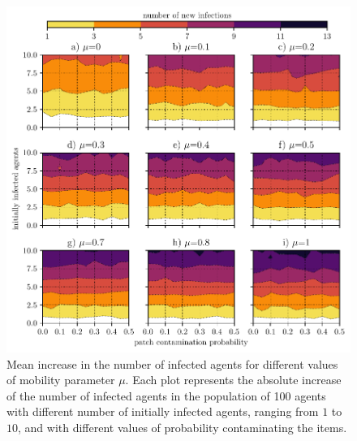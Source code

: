 \documentclass[10pt,a4paper]{article}
\begin{document}
\begin{figure}[ht!]
\begin{center}
\includegraphics[scale=0.75]{plots/sick_increase_large_s_pop100.pdf}
\end{center}
\caption{Mean increase in the number of infected agents for different values of mobility parameter $\mu$. Each plot represents the absolute increase of the number of infected agents in the population of 100 agents with different number of initially infected agents, ranging from $1$ to $10$,  and with different values of probability contaminating the items.}
\label{fig:sick_increase_large_s_pop100}
\end{figure}
\end{document}
